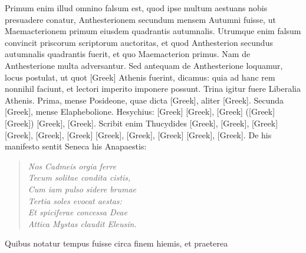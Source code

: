 Primum enim
illud omnino falsum est, quod ipse multum aestuans nobis presuadere
conatur, Anthesterionem secundum mensem Autumni fuisse, ut Maemacterionem
primum eiusdem quadrantis autumnalis.
Utrumque
enim falsum convincit priscorum scriptorum auctoritas, et quod Anthesterion
secundus autumnalis quadrantis fuerit, et quo Maemacterion
primus.
Nam de Anthesterione multa adversantur.
Sed antequam de Anthesterione loquamur, locus postulat, ut quot
 \textgreek{[Greek]}
Athenis fuerint, dicamus: quia ad hanc rem nonnihil faciunt, et lectori
imperito imponere possunt.
Trina igitur fuere Liberalia Athenis.
Prima, mense Posideone, quae dicta \textgreek{[Greek]},
 aliter \textgreek{[Greek]}.
Secunda \textgreek{[Greek]}, mense Elaphebolione.
Hesychius: \textgreek{[Greek]}
\textgreek{[Greek]}, \textgreek{[Greek]} (\textgreek{[Greek]}
\textgreek{[Greek]}) \textgreek{[Greek]}, \textgreek{[Greek]}.
Scribit enim
Thucydides \textgreek{[Greek]}, \textgreek{[Greek]}, \textgreek{[Greek]}
\textgreek{[Greek]}, \textgreek{[Greek]}, \textgreek{[Greek]}
\textgreek{[Greek]}, \textgreek{[Greek]}, \textgreek{[Greek]}
\textgreek{[Greek]}, \textgreek{[Greek]}.
De his manifesto sentit Seneca his Anapaestis:
\begin{quote}
  \emph{Nos Cadmeis orgia ferre\\
  Tecum solitae condita cistis,\\
  Cum iam pulso sidere brumae\\
  Tertia soles evocat aestas:\\
  Et spiciferae concessa Deae\\
  Attica Mystas claudit Eleusin.}
\end{quote}
Quibus notatur tempus fuisse circa finem hiemis, et praeterea
